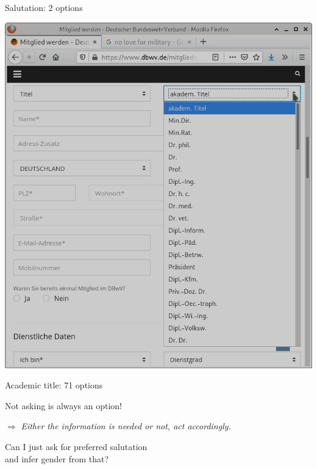 \documentclass[aspectratio=169,x11names]{beamer}
\begin{document}
\begin{frame}
\begin{minipage}{0.5\textwidth}
\begin{center}
Salutation: 2 options
\end{center}
\end{minipage}%
\begin{minipage}{0.5\textwidth}
\begin{center}
\includegraphics[height=0.7\textheight,keepaspectratio]{images/dbwva.png} 
\medskip\large

Academic title: 71 options
\end{center}
\end{minipage}
\end{frame}

\begin{frame}
\begin{center}
\huge
Not asking is always an option!
\medskip

\Large
$\Rightarrow$ \emph{Either the information is needed or not, act accordingly.}
\end{center}
\end{frame}

\begin{frame}
\begin{center}
\huge
Can I just ask for preferred salutation\\ and infer gender from that?
\end{center}
\end{frame}
\end{document}
